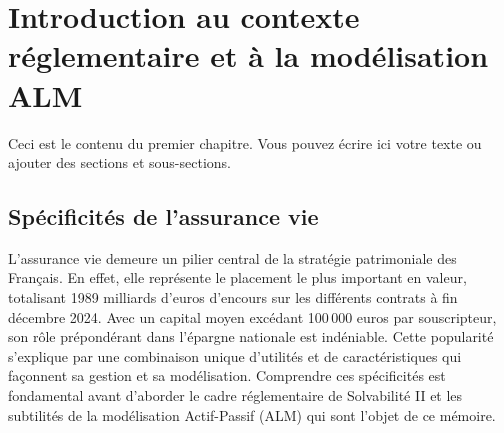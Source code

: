 \chapter{Introduction au contexte réglementaire et à la modélisation ALM}
Ceci est le contenu du premier chapitre. Vous pouvez écrire ici votre texte ou ajouter des sections et sous-sections.


\section{Spécificités de l'assurance vie}
\label{sec:specificites_assurance_vie}

L'assurance vie demeure un pilier central de la stratégie patrimoniale des Français. En effet, elle représente le placement le plus important en valeur, totalisant 1989 milliards d’euros d’encours sur les différents contrats à fin décembre 2024. Avec un capital moyen excédant 100\,000 euros par souscripteur, son rôle prépondérant dans l'épargne nationale est indéniable. Cette popularité s'explique par une combinaison unique d'utilités et de caractéristiques qui façonnent sa gestion et sa modélisation. Comprendre ces spécificités est fondamental avant d'aborder le cadre réglementaire de Solvabilité II et les subtilités de la modélisation Actif-Passif (ALM) qui sont l'objet de ce mémoire.

